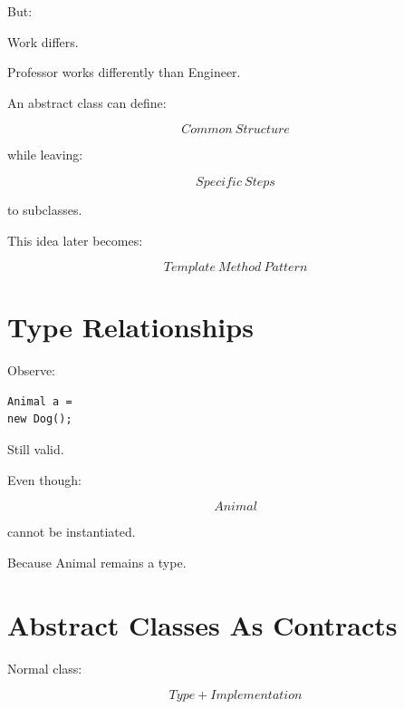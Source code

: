 \documentclass[11pt,a4paper]{book}
\begin{document}
But:

Work differs.


Professor works differently than Engineer.


An abstract class can define:

\[
Common\ Structure
\]

while leaving:

\[
Specific\ Steps
\]

to subclasses.


This idea later becomes:

\[
Template\ Method\ Pattern
\]


\section{Type Relationships}

Observe:

\begin{verbatim}
Animal a =
new Dog();
\end{verbatim}


Still valid.


Even though:

\[
Animal
\]

cannot be instantiated.


Because Animal remains a type.


\section{Abstract Classes As Contracts}

Normal class:

\[
Type
+
Implementation
\]

\end{document}
